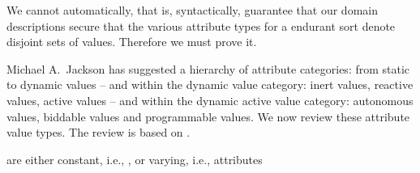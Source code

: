 \begynd
\pind We cannot automatically, that is, syntactically, \nyl
      guarantee that our domain descriptions secure that
\begynd
\pind the various attribute types
\pind for a endurant sort 
\pind denote disjoint sets of values. 
\afslut
      Therefore we must prove it. 
\afslut

\label{Attribute Categories}

\begynd
\pind Michael A.\ Jackson \cite{lexicon} has suggested a hierarchy of
      attribute categories:
\begynd
\pind from static
\pind to dynamic values -- and within the dynamic value category:
\begynd
\pind inert values,
\pind reactive values, 
\pind active values -- and within the dynamic active value category:
\begynd
\pind autonomous values,
\pind biddable values and
\pind programmable values.
\afslut
\afslut  
\afslut%
\pind We now review these attribute value types. \nyl
      The review is based on .
\afslut%
\mnewfoil%

\begynd
\pind {} are 
\begynd
\pind either constant, i.e.,  , 
\pind or varying, i.e.,   
\afslut attributes
\afslut

\mnewfoil
{}


